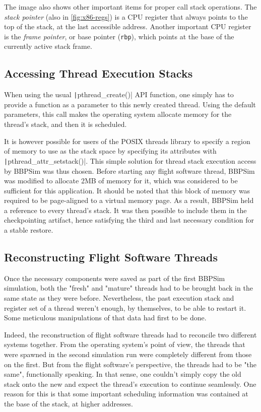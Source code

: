 The image also shows other important items for proper call stack operations. The \textit{stack pointer} (also in \autoref{fig:x86-regs}) is a CPU register that always points to the top of the stack, at the last accessible address. Another important CPU register is the \textit{frame pointer}, or base pointer (\texttt{rbp}), which points at the base of the currently active stack frame. 

\subsection*{Accessing Thread Execution Stacks}
When using the usual \texttt|pthread_create()| API function, one simply has to provide a function as a parameter to this newly created thread. Using the default parameters, this call makes the operating system allocate memory for the thread's stack, and then it is scheduled\cite{online:pthread-create}.

It is however possible for users of the POSIX threads library to specify a region of memory to use as the stack space by specifying its attributes with \texttt|pthread_attr_setstack()|. This simple solution for thread stack execution access by BBPSim was thus chosen. Before starting any flight software thread, \gls{BBPSim} was modified to allocate 2MB of memory for it, which was considered to be sufficient for this application. It should be noted that this block of memory was required to be page-aligned to a virtual memory page. As a result, BBPSim held a reference to every thread's stack. It was then possible to include them in the checkpointing artifact, hence satisfying the third and last necessary condition for a stable restore.

\subsection*{Reconstructing Flight Software Threads}
Once the necessary components were saved as part of the first BBPSim simulation, both the "fresh" and "mature" threads had to be brought back in the same state as they were before. Nevertheless, the past execution stack and register set of a thread weren't enough, by themselves, to be able to restart it. Some meticulous manipulations of that data had first to be done. 

Indeed, the reconstruction of flight software threads had to reconcile two different systems together. From the operating system's point of view, the threads that were spawned in the second simulation run were completely different from those on the first. But from the flight software's perspective, the threads had to be "the same", functionally speaking. In that sense, one couldn't simply copy the old stack onto the new and expect the thread's execution to continue seamlessly. One reason for this is that some important scheduling information was contained at the base of the stack, at higher addresses. 


